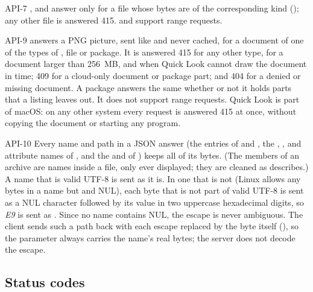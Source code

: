 \begin{req}{API-7}
,  and  answer only for a file whose
bytes are of the corresponding kind (); any other file is answered 415.
 and  support range requests.
\end{req}

\begin{req}{API-9}
 answers a PNG picture, sent like  and never
cached, for a document of one of the types of , file or package.  It is
answered 415 for any other type, for a document larger than 256~MB, and when Quick
Look cannot draw the document in time; 409 for a cloud-only document or package part;
and 404 for a denied or missing document.  A package answers the same whether or not
it holds parts that a listing leaves out.  It does not support range requests.  Quick
Look is part of macOS: on any other system every request is answered 415 at once,
without copying the document or starting any program.
\end{req}

\begin{req}{API-10}
Every name and path in a JSON answer (the entries of  and
, the , ,  and attribute
names of , and the  and  of )
keeps all of its bytes.  (The members of an archive are names inside a file, only ever
displayed; they are cleaned as  describes.)  A name that is valid UTF-8 is sent as it
is.  In one that is not (Linux allows any bytes in a name but \code{/} and NUL), each
byte that is not part of valid UTF-8 is sent as a NUL character followed by its value
in two uppercase hexadecimal digits, so \textit{E9} is sent as
.  Since no name contains NUL, the escape is
never ambiguous.  The client sends such a path back with each escape replaced by the
byte itself (), so the  parameter always carries the
name's real bytes; the server does not decode the escape.
\end{req}

\subsection{Status codes}

